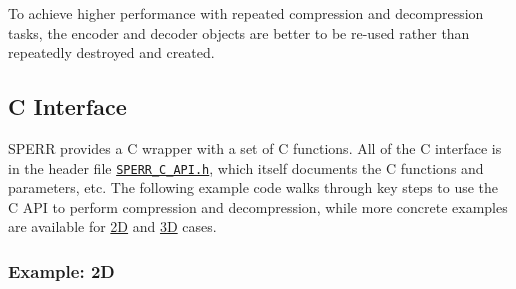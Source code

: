 \documentclass{article}
\newcommand{\callout}[1]{\begin{BlueBox}#1\end{BlueBox}}
\begin{document}
\callout{To achieve higher performance with repeated compression and 
         decompression tasks, the encoder and decoder objects are better to be
         re-used rather than repeatedly destroyed and created.}

\subsection{C Interface}
\label{sec:c}
SPERR provides a C wrapper with a set of C functions. 
All of the C interface is in the header file
\href{https://github.com/NCAR/SPERR/blob/main/include/SPERR_C_API.h}{\texttt{SPERR\_C\_API.h}},
which itself documents the C functions and parameters, etc.
The following example code walks through key steps to use the C API to perform
compression and decompression, while more concrete examples are available
for \href{https://github.com/NCAR/SPERR/blob/main/examples/C_API/2d.c}{2D}
and \href{https://github.com/NCAR/SPERR/blob/main/examples/C_API/3d.c}{3D} cases.

\subsubsection{Example: 2D}
\end{document}

